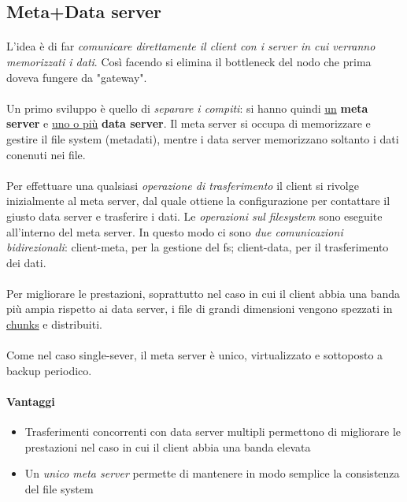 \documentclass{article}
\begin{document}
\subsection{Meta+Data server}

\paragraph{} L'idea è di far \emph{comunicare direttamente il client con i server in cui verranno memorizzati i dati}. Così facendo si elimina il bottleneck del nodo che prima doveva fungere da "gateway". 

\paragraph{} Un primo sviluppo è quello di \emph{separare i compiti}: si hanno quindi \underline{un} \textbf{meta server} e \underline{uno o più} \textbf{data server}. Il meta server si occupa di memorizzare e gestire il file system (metadati), mentre i data server memorizzano soltanto i dati conenuti nei file. 

\paragraph{} Per effettuare una qualsiasi \emph{operazione di trasferimento} il client si rivolge inizialmente al meta server, dal quale ottiene la configurazione per contattare il giusto data server e trasferire i dati. Le \emph{operazioni sul filesystem} sono eseguite all'interno del meta server. In questo modo ci sono \emph{due comunicazioni bidirezionali}: client-meta, per la gestione del fs; client-data, per il trasferimento dei dati.

\paragraph{} Per migliorare le prestazioni, soprattutto nel caso in cui il client abbia una banda più ampia rispetto ai data server, i file di grandi dimensioni vengono spezzati in \underline{chunks} e distribuiti. 

\paragraph{} Come nel caso single-sever, il meta server è unico, virtualizzato e sottoposto a backup periodico. 

\paragraph{Vantaggi} \begin{itemize}
	\item Trasferimenti concorrenti con data server multipli permettono di migliorare le prestazioni nel caso in cui il client abbia una banda elevata
	\item Un \emph{unico meta server} permette di mantenere in modo semplice la consistenza del file system
\end{itemize}
\end{document}
